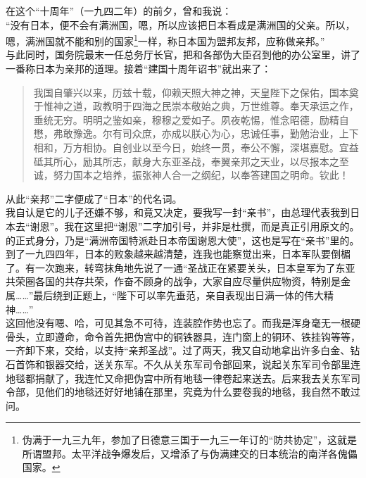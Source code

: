 在这个“十周年”（一九四二年）的前夕，曾和我说：\\

“没有日本，便不会有满洲国，嗯，所以应该把日本看成是满洲国的父亲。所以，嗯，满洲国就不能和别的国家\footnote{伪满于一九三九年，参加了日德意三国于一九三一年订的“防共协定”，这就是所谓盟邦。太平洋战争爆发后，又增添了与伪满建交的日本统治的南洋各傀儡国家。}一样，称日本国为盟邦友邦，应称做亲邦。”\\

与此同时，国务院最末一任总务厅长官，把和各部伪大臣召到他的办公室里，讲了一番称日本为亲邦的道理。接着“建国十周年诏书”就出来了：\\

\begin{quote}
	我国自肇兴以来，历兹十载，仰赖天照大神之神，天皇陛下之保佑，国本奠于惟神之道，政教明于四海之民崇本敬始之典，万世维尊。奉天承运之作，垂统无穷。明明之鉴如亲，穆穆之爱如子。夙夜乾惕，惟念昭德，励精自懋，弗敢豫逸。尔有司众庶，亦成以朕心为心，忠诚任事，勤勉治业，上下相和，万方相协。自创业以至今日，始终一贯，奉公不懈，深堪嘉慰。宜益砥其所心，励其所志，献身大东亚圣战，奉翼亲邦之天业，以尽报本之至诚，努力国本之培养，振张神人合一之纲纪，以奉答建国之明命。钦此！
\end{quote}

从此“亲邦”二字便成了“日本”的代名词。\\

我自认是它的儿子还嫌不够，和竟又决定，要我写一封“亲书”，由总理代表我到日本去“谢恩”。我在这里把“谢恩”二字加引号，并非是杜撰，而是真正引用原文的。的正式身分，乃是“满洲帝国特派赴日本帝国谢恩大使”，这也是写在“亲书”里的。\\

到了一九四四年，日本的败象越来越清楚，连我也能察觉出来，日本军队要倒楣了。有一次跑来，转弯抹角地先说了一通“圣战正在紧要关头，日本皇军为了东亚共荣圈各国的共存共荣，作奋不顾身的战争，大家自应尽量供应物资，特别是金属……”最后绕到正题上，“陛下可以率先垂范，亲自表现出日满一体的伟大精神……”\\

这回他没有嗯、哈，可见其急不可待，连装腔作势也忘了。而我是浑身毫无一根硬骨头，立即遵命，命令首先把伪宫中的铜铁器具，连门窗上的铜环、铁挂钩等等，一齐卸下来，交给，以支持“亲邦圣战”。过了两天，我又自动地拿出许多白金、钻石首饰和银器交给，送关东军。不久从关东军司令部回来，说起关东军司令部里连地毯都捐献了，我连忙又命把伪宫中所有地毯一律卷起来送去。后来我去关东军司令部，见他们的地毯还好好地铺在那里，究竟为什么要卷我的地毯，我自然不敢过问。\\

